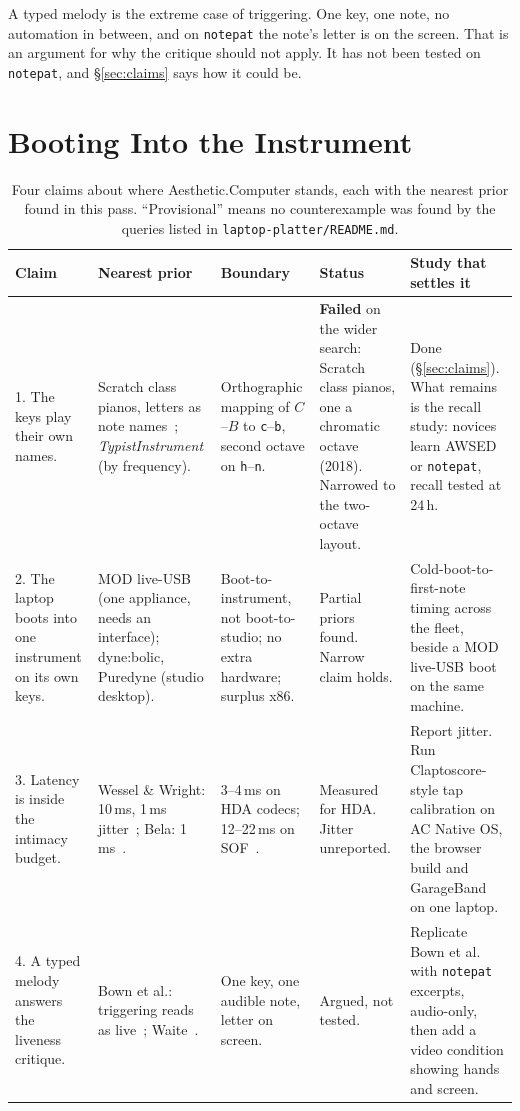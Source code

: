 \documentclass[10pt,letterpaper,twocolumn]{article}
\newcommand{\acdot}{{\color{acpink}.}}
\newcommand{\ac}{Aesthetic{\acdot}Computer}
\newcommand{\acos}{AC Native OS}
\newcommand{\np}{\texttt{notepat}}
\newcommand{\key}[1]{\texttt{#1}}
\begin{document}
A typed melody is the extreme case of triggering. One key, one note, no automation in between, and on \np{} the note's letter is on the screen. That is an argument for why the critique should not apply. It has not been tested on \np{}, and §\ref{sec:claims} says how it could be.

\section{Booting Into the Instrument}

\begin{table}[t]
\centering
\footnotesize
\renewcommand{\arraystretch}{1.2}
\begin{tabularx}{\textwidth}{@{}R{3.1cm}YYR{2.0cm}Y@{}}
\toprule
\textbf{Claim} & \textbf{Nearest prior} & \textbf{Boundary} & \textbf{Status} & \textbf{Study that settles it} \\
. The keys play their own names. & Scratch class pianos, letters as note names~\citep{persam2018scratch}; \emph{TypistInstrument} (by frequency). & Orthographic mapping of $C$--$B$ to \key{c}--\key{b}, second octave on \key{h}--\key{n}. & \textbf{Failed} on the wider search: Scratch class pianos, one a chromatic octave (2018). Narrowed to the two-octave layout. & Done (§\ref{sec:claims}). What remains is the recall study: novices learn AWSED or \np{}, recall tested at 24\,h. \\
2. The laptop boots into one instrument on its own keys. & MOD live-USB (one appliance, needs an interface); dyne:bolic, Puredyne (studio desktop). & Boot-to-instrument, not boot-to-studio; no extra hardware; surplus x86. & Partial priors found. Narrow claim holds. & Cold-boot-to-first-note timing across the fleet, beside a MOD live-USB boot on the same machine. \\
3. Latency is inside the intimacy budget. & Wessel \& Wright: 10\,ms, 1\,ms jitter~\citep{wessel2002problems}; Bela: 1\,ms~\citep{moro2016bela}. & 3--4\,ms on HDA codecs; 12--22\,ms on SOF~\citep{scudder2026latency}. & Measured for HDA. Jitter unreported. & Report jitter. Run Claptoscore-style tap calibration on \acos{}, the browser build and GarageBand on one laptop. \\
4. A typed melody answers the liveness critique. & Bown et al.: triggering reads as live~\citep{bown2014liveness}; Waite~\citep{waite2015keyboard}. & One key, one audible note, letter on screen. & Argued, not tested. & Replicate Bown et al. with \np{} excerpts, audio-only, then add a video condition showing hands and screen. \\
\bottomrule
\end{tabularx}
\caption{Four claims about where \ac{} stands, each with the nearest prior found in this pass. ``Provisional'' means no counterexample was found by the queries listed in \texttt{laptop-platter/README.md}.}
\label{tab:claims}
\end{table}
\end{document}
